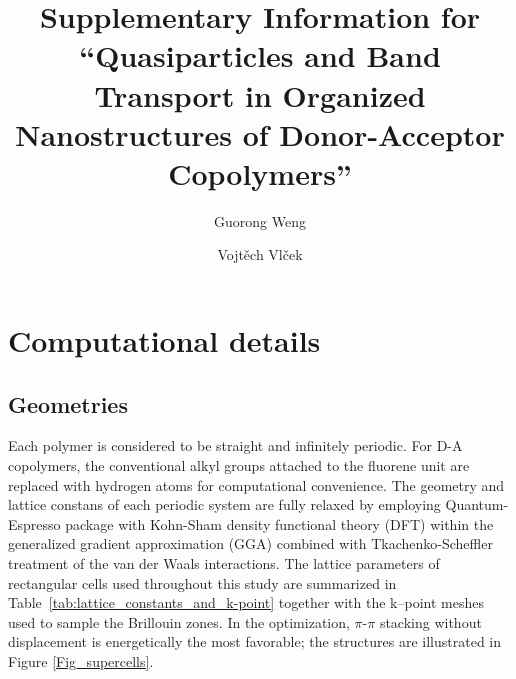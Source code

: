 \documentclass[journal = jpclcd]{achemso}
\date{}
\author{Guorong Weng}
\author{Vojt\v{e}ch Vl\v{c}ek}
\affiliation{Department of Chemistry and Biochemistry, University of California, Santa Barbara, 93106, U.S.A}
\title{Supplementary Information for  ``Quasiparticles and Band Transport in Organized Nanostructures of Donor-Acceptor Copolymers''}
\begin{document}
\maketitle

\section{Computational details}

\subsection{Geometries}

Each polymer is considered to be straight and infinitely periodic. For D-A copolymers, the conventional alkyl groups attached to the fluorene unit are replaced with hydrogen atoms for computational convenience. The geometry and lattice constans of each periodic system are fully relaxed by employing Quantum-Espresso package \cite{Giannozzi2009,Giannozzi2017} with Kohn-Sham density functional theory (DFT) within the generalized gradient approximation (GGA) \cite{Perdew1996} combined with Tkachenko-Scheffler treatment of the van der Waals interactions.\cite{Tkatchenko2009} The lattice parameters of rectangular cells used throughout this study are summarized in Table~\ref{tab:lattice_constants_and_k-point} together with the k--point meshes used to sample the Brillouin zones. In the optimization, $\pi$-$\pi$ stacking without displacement is energetically the most favorable; the structures are illustrated in Figure \ref{Fig_supercells}.
\end{document}
